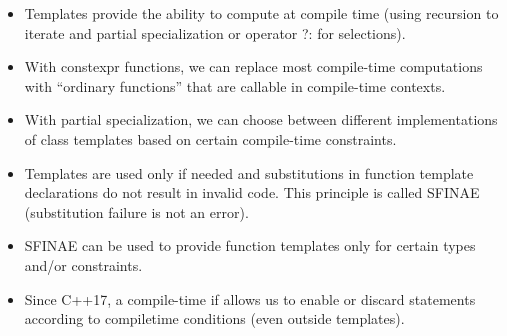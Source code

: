 
\begin{itemize}
\item 
Templates provide the ability to compute at compile time (using recursion to iterate and partial specialization or operator ?: for selections).

\item 
With constexpr functions, we can replace most compile-time computations with “ordinary functions” that are callable in compile-time contexts.

\item 
With partial specialization, we can choose between different implementations of class templates based on certain compile-time constraints.

\item 
Templates are used only if needed and substitutions in function template declarations do not result in invalid code. This principle is called SFINAE (substitution failure is not an error).

\item 
SFINAE can be used to provide function templates only for certain types and/or constraints.

\item 
Since C++17, a compile-time if allows us to enable or discard statements according to compiletime conditions (even outside templates).
\end{itemize}